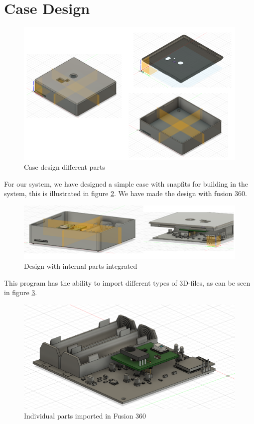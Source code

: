 \documentclass[11pt,a4paper]{article}
\begin{document}
\section{Case Design}
\begin{figure}[H]
	\centering
	\includegraphics[width=1.0\linewidth]{case_design.png}
	\caption{Case design different parts}
	\label{fig:case_design}
\end{figure}
For our system, we have designed a simple case with snapfits for building in the system, this is illustrated in figure \ref{fig:snapfits_total}. We have made the design with fusion 360. 
\begin{figure}[H]
	\centering
	\includegraphics[width=1.0\linewidth]{snapfits_total.png}
	\caption{Design with internal parts integrated}
	\label{fig:snapfits_total}
\end{figure}
This program has the ability to import different types of 3D-files, as can be seen in figure \ref{fig:electronic_system}. 
\begin{figure}[H]
	\centering
	\includegraphics[width=1.0\linewidth]{electronic_system.png}
	\caption{Individual parts imported in Fusion 360}
	\label{fig:electronic_system}
\end{figure}
\end{document}
